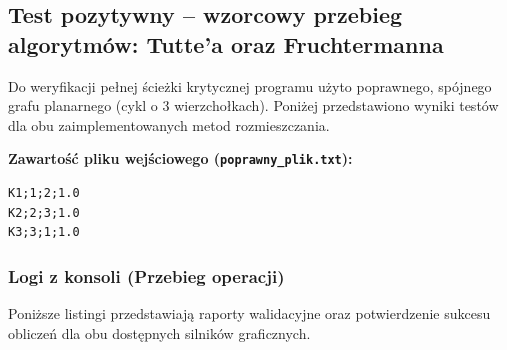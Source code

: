 \documentclass[12pt,a4paper]{article}
\begin{document}
\subsection{Test pozytywny – wzorcowy przebieg algorytmów: Tutte'a oraz Fruchtermanna}

Do weryfikacji pełnej ścieżki krytycznej programu użyto poprawnego, spójnego grafu planarnego (cykl o 3 wierzchołkach). Poniżej przedstawiono wyniki testów dla obu zaimplementowanych metod rozmieszczania.

\textbf{Zawartość pliku wejściowego (\texttt{poprawny\_plik.txt}):}
\begin{verbatim}
K1;1;2;1.0
K2;2;3;1.0
K3;3;1;1.0
\end{verbatim}

\subsubsection{Logi z konsoli (Przebieg operacji)}
Poniższe listingi przedstawiają raporty walidacyjne oraz potwierdzenie sukcesu obliczeń dla obu dostępnych silników graficznych.
\end{document}
